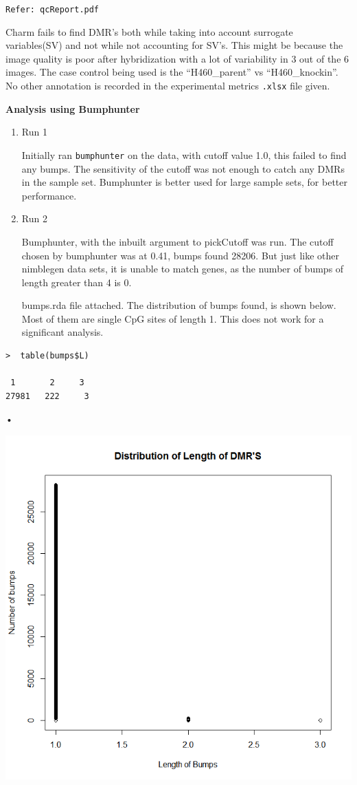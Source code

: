 \documentclass[11pt]{article}
\begin{document}
{\tt Refer: qcReport.pdf}


Charm fails to find DMR’s both while taking into account surrogate variables(SV) and not while not accounting for SV's. This might be because the image quality is poor after hybridization with a lot of variability in 3 out of the 6 images. The case control being used is the “H460\_parent” vs “H460\_knockin”. No other annotation is recorded in the experimental metrics {\tt .xlsx} file given.



{\bf Analysis using Bumphunter}

\begin{enumerate}

\item Run  1

Initially ran {\tt bumphunter} on the data, with cutoff value 1.0, this failed to find any bumps. The sensitivity of the cutoff was not enough to catch any DMRs in the sample set. Bumphunter is better used for large sample sets, for better performance. 


\item Run  2

Bumphunter, with the inbuilt argument to pickCutoff was run. The cutoff chosen by bumphunter was at 0.41, bumps found 28206. But just like other nimblegen data sets, it is unable to match genes, as the number of bumps of length greater than 4 is 0.

bumps.rda file attached. The distribution of bumps found, is shown below. Most of them are single CpG sites of length 1. This does not work for a significant analysis.

\end{enumerate}


\begin{verbatim}
>  table(bumps$L)

 1       2     3 
27981   222     3 
\end{verbatim}•

\includegraphics[scale=0.5]{bumpsDistribution.png}
\end{document}
